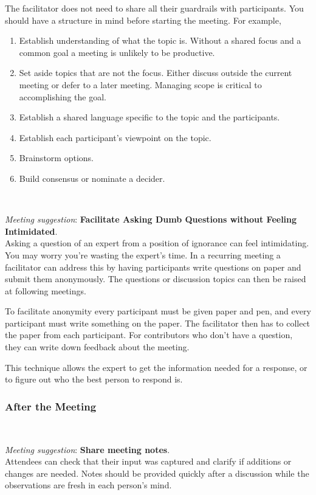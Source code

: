 The facilitator does not need to share all their guardrails with participants. You should have a structure in mind before starting the meeting. For example,
\begin{enumerate}
    \item Establish understanding of what the topic is. Without a shared focus and a common goal a meeting is unlikely to be productive. 
    \item Set aside topics that are not the focus. Either discuss outside the current meeting or defer to a later meeting. Managing scope is critical to accomplishing the goal. 
    \item Establish a shared language specific to the topic and the participants.
    \item Establish each participant's viewpoint on the topic.
    \item Brainstorm options.
    \item Build consensus or nominate a decider.
\end{enumerate}


\ \\
\begin{samepage}
\textit{Meeting suggestion}: \textbf{Facilitate Asking Dumb Questions without Feeling Intimidated}.\\
\nopagebreak %
Asking a question of an expert from a position of ignorance can feel intimidating. You may worry you're wasting the expert's time. In a recurring meeting a facilitator can address this by having participants write questions on paper and submit them anonymously. The questions or discussion topics can then be raised at following meetings. 
\end{samepage}

To facilitate anonymity every participant must be given paper and pen, and every participant must write something on the paper. The facilitator then has to collect the paper from each participant. For contributors who don't have a question, they can write down feedback about the meeting. 

This technique allows the expert to get the information needed for a response, or to figure out who the best person to respond is. 

\subsubsection*{After the Meeting}

\ \\
\begin{samepage}
\textit{Meeting suggestion}: \textbf{Share meeting notes}.\\
Attendees can check that their input was captured and clarify if additions or changes are needed. Notes should be provided quickly after a discussion while the observations are fresh in each person's mind.
\end{samepage}

